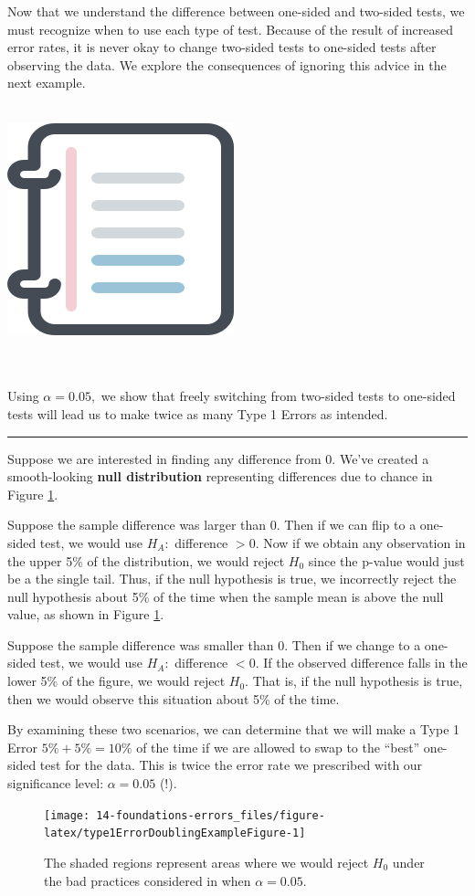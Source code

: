\documentclass[
  10pt,
  openany]{book}
\newenvironment{mdframedwithfootGPWE}
{   
    \savenotes
    \begin{mdframed}[%
    topline=true, bottomline=true, linecolor=oiB, linewidth=0.5pt,
    rightline=false, leftline=false,
    backgroundcolor=oiLGray]
    \renewcommand{\thempfootnote}{\arabic{footnote}}
    }
{
    \end{mdframed}
    \spewnotes
}
\newenvironment{workedexample}{
    \let\oldrule\rule
    \renewcommand{\rule}[2]{\vspace{-2mm}\oldrule{##1}{##2}\vspace{-2mm}}
\vspace{4mm}
\begin{mdframedwithfootGPWE}
\begin{minipage}[t]{0.10\textwidth}
{$\:$ \\ \setkeys{Gin}{width=2.5em,keepaspectratio}\includegraphics{images/_icons/worked-example.png}}
\end{minipage}
\hfill
\begin{minipage}[t]{0.90\textwidth}
\vspace{-2mm}
\setlength{\parskip}{1em}
\noindent\textbf{\color{oiB}\small\fontfamily{phv}\selectfont{\MakeUppercase{Example}}} $\:$ \\ \\
}{\end{minipage}
\end{mdframedwithfootGPWE}
\vspace{4mm}
}
\begin{document}
Now that we understand the difference between one-sided and two-sided tests, we must recognize when to use each type of test.
Because of the result of increased error rates, it is never okay to change two-sided tests to one-sided tests after observing the data.
We explore the consequences of ignoring this advice in the next example.

\begin{workedexample}
Using \(\alpha=0.05,\) we show that freely switching from two-sided tests to one-sided tests will lead us to make twice as many Type 1 Errors as intended.

\begin{center}\rule{0.5\linewidth}{0.5pt}\end{center}

Suppose we are interested in finding any difference from 0.
We've created a smooth-looking \textbf{null distribution} representing differences due to chance in Figure \ref{fig:type1ErrorDoublingExampleFigure}.

Suppose the sample difference was larger than 0.
Then if we can flip to a one-sided test, we would use \(H_A:\) difference \(> 0.\) Now if we obtain any observation in the upper 5\% of the distribution, we would reject \(H_0\) since the p-value would just be a the single tail.
Thus, if the null hypothesis is true, we incorrectly reject the null hypothesis about 5\% of the time when the sample mean is above the null value, as shown in Figure \ref{fig:type1ErrorDoublingExampleFigure}.

Suppose the sample difference was smaller than 0.
Then if we change to a one-sided test, we would use \(H_A:\) difference \(< 0.\) If the observed difference falls in the lower 5\% of the figure, we would reject \(H_0.\) That is, if the null hypothesis is true, then we would observe this situation about 5\% of the time.

By examining these two scenarios, we can determine that we will make a Type 1 Error \(5\%+5\%=10\%\) of the time if we are allowed to swap to the ``best'' one-sided test for the data.
This is twice the error rate we prescribed with our significance level: \(\alpha=0.05\) (!).

\end{workedexample}

\begin{figure}[h]

{\centering \texttt{[image: 14-foundations-errors\_files/figure-latex/type1ErrorDoublingExampleFigure-1]} 

}

\caption{The shaded regions represent areas where we would reject $H_0$ under the bad practices considered in when $\alpha = 0.05.$}\label{fig:type1ErrorDoublingExampleFigure}
\end{figure}
\end{document}
